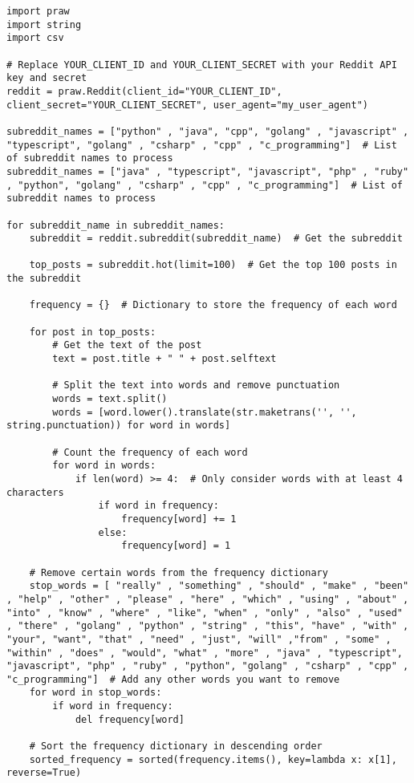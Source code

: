 \documentclass{article}
\theoremstyle{theorem}
\theoremstyle{definition}
\theoremstyle{remark}
\begin{document}
\begin{lstlisting}
import praw
import string
import csv

# Replace YOUR_CLIENT_ID and YOUR_CLIENT_SECRET with your Reddit API key and secret
reddit = praw.Reddit(client_id="YOUR_CLIENT_ID", client_secret="YOUR_CLIENT_SECRET", user_agent="my_user_agent")

subreddit_names = ["python" , "java", "cpp", "golang" , "javascript" , "typescript", "golang" , "csharp" , "cpp" , "c_programming"]  # List of subreddit names to process
subreddit_names = ["java" , "typescript", "javascript", "php" , "ruby" , "python", "golang" , "csharp" , "cpp" , "c_programming"]  # List of subreddit names to process

for subreddit_name in subreddit_names:
    subreddit = reddit.subreddit(subreddit_name)  # Get the subreddit

    top_posts = subreddit.hot(limit=100)  # Get the top 100 posts in the subreddit

    frequency = {}  # Dictionary to store the frequency of each word

    for post in top_posts:
        # Get the text of the post
        text = post.title + " " + post.selftext

        # Split the text into words and remove punctuation
        words = text.split()
        words = [word.lower().translate(str.maketrans('', '', string.punctuation)) for word in words]

        # Count the frequency of each word
        for word in words:
            if len(word) >= 4:  # Only consider words with at least 4 characters
                if word in frequency:
                    frequency[word] += 1
                else:
                    frequency[word] = 1

    # Remove certain words from the frequency dictionary
    stop_words = [ "really" , "something" , "should" , "make" , "been" , "help" , "other" , "please" , "here" , "which" , "using" , "about" , "into" , "know" , "where" , "like", "when" , "only" , "also" , "used" , "there" , "golang" , "python" , "string" , "this", "have" , "with" , "your", "want", "that" , "need" , "just", "will" ,"from" , "some" , "within" , "does" , "would", "what" , "more" , "java" , "typescript", "javascript", "php" , "ruby" , "python", "golang" , "csharp" , "cpp" , "c_programming"]  # Add any other words you want to remove
    for word in stop_words:
        if word in frequency:
            del frequency[word]

    # Sort the frequency dictionary in descending order
    sorted_frequency = sorted(frequency.items(), key=lambda x: x[1], reverse=True)


\end{lstlisting}
\end{document}
